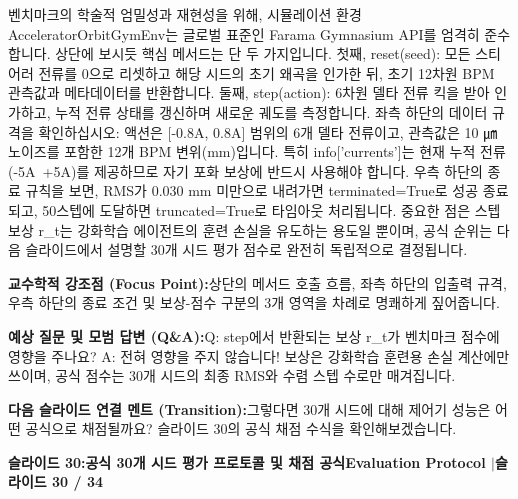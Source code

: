 \documentclass[11pt,a4paper]{article}
\begin{document}
\begin{tcolorbox}[colback=white,colframe=primaryblue,title={\footnotesize\bfseries\color{white}발표자 구두 대본 (Spoken Script)},fontupper=\small,left=6pt,right=6pt,top=3pt,bottom=3pt,boxrule=0.8pt,arc=2.5pt]
벤치마크의 학술적 엄밀성과 재현성을 위해, 시뮬레이션 환경 AcceleratorOrbitGymEnv는 글로벌 표준인 Farama Gymnasium API를 엄격히 준수합니다. 상단에 보시듯 핵심 메서드는 단 두 가지입니다. 첫째, reset(seed): 모든 스티어러 전류를 0으로 리셋하고 해당 시드의 초기 왜곡을 인가한 뒤, 초기 12차원 BPM 관측값과 메타데이터를 반환합니다. 둘째, step(action): 6차원 델타 전류 킥을 받아 인가하고, 누적 전류 상태를 갱신하며 새로운 궤도를 측정합니다. 좌측 하단의 데이터 규격을 확인하십시오: 액션은 [-0.8A, 0.8A] 범위의 6개 델타 전류이고, 관측값은 10 ㎛ 노이즈를 포함한 12개 BPM 변위(mm)입니다. 특히 info['currents']는 현재 누적 전류(-5A~+5A)를 제공하므로 자기 포화 보상에 반드시 사용해야 합니다. 우측 하단의 종료 규칙을 보면, RMS가 0.030 mm 미만으로 내려가면 terminated=True로 성공 종료되고, 50스텝에 도달하면 truncated=True로 타임아웃 처리됩니다. 중요한 점은 스텝 보상 r\_t는 강화학습 에이전트의 훈련 손실을 유도하는 용도일 뿐이며, 공식 순위는 다음 슬라이드에서 설명할 30개 시드 평가 점수로 완전히 독립적으로 결정됩니다.
\end{tcolorbox}
\vspace{0.2em}
\begin{tcolorbox}[colback=lightbg,colframe=bordergray,left=6pt,right=6pt,top=3pt,bottom=3pt,boxrule=0.6pt,arc=2.5pt]
\small
\noindent\textbf{\color{navy}교수학적 강조점 (Focus Point):}\enspace 상단의 메서드 호출 흐름, 좌측 하단의 입출력 규격, 우측 하단의 종료 조건 및 보상-점수 구분의 3개 영역을 차례로 명쾌하게 짚어줍니다.\par\vspace{0.3em}
\noindent\textbf{\color{successgreen}예상 질문 및 모범 답변 (Q\&A):}\enspace Q: step에서 반환되는 보상 r\_t가 벤치마크 점수에 영향을 주나요? A: 전혀 영향을 주지 않습니다! 보상은 강화학습 훈련용 손실 계산에만 쓰이며, 공식 점수는 30개 시드의 최종 RMS와 수렴 스텝 수로만 매겨집니다.\par\vspace{0.3em}
\noindent\textbf{\color{accent}다음 슬라이드 연결 멘트 (Transition):}\enspace 그렇다면 30개 시드에 대해 제어기 성능은 어떤 공식으로 채점될까요? 슬라이드 30의 공식 채점 수식을 확인해보겠습니다.
\end{tcolorbox}
\clearpage
\hypertarget{slide.30}{}
{}
\noindent\begin{tcolorbox}[colback=navy,colframe=navy,left=6pt,right=6pt,top=3pt,bottom=3pt,boxrule=0pt,arc=2pt]
{\large\bfseries\color{white}슬라이드 30:\enspace 공식 30개 시드 평가 프로토콜 및 채점 공식}\hfill{\footnotesize\bfseries\color{white!85!lightbg}Evaluation Protocol \enspace$|$\enspace 슬라이드 30 / 34}
\end{tcolorbox}
\end{document}
